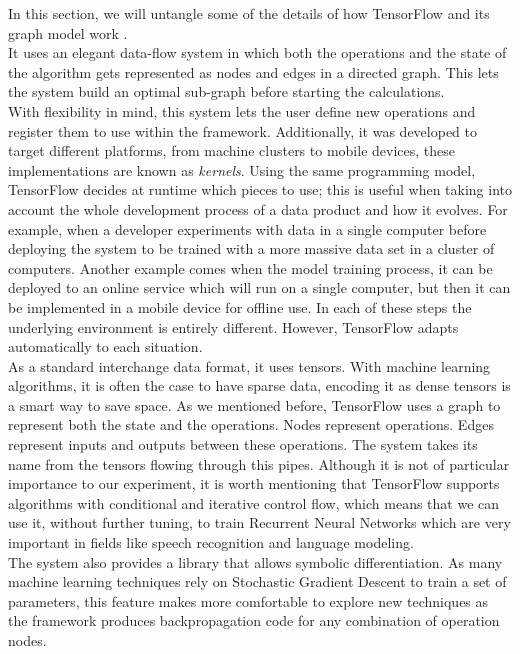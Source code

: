 In this section, we will untangle some of the details of how TensorFlow and its graph model work \cite{DBLP:journals/corr/AbadiBCCDDDGIIK16}.\\

It uses an elegant data-flow system in which both the operations and the state of the algorithm gets represented as nodes and edges in a directed graph. This lets the system build an optimal sub-graph before starting the calculations.\\

With flexibility in mind, this system lets the user define new operations and register them to use within the framework. Additionally, it was developed to target different platforms, from machine clusters to mobile devices, these implementations are known as \textit{kernels}. Using the same programming model, TensorFlow decides at runtime which pieces to use; this is useful when taking into account the whole development process of a data product and how it evolves. For example, when a developer experiments with data in a single computer before deploying the system to be trained with a more massive data set in a cluster of computers. Another example comes when the model training process, it can be deployed to an online service which will run on a single computer, but then it can be implemented in a mobile device for offline use. In each of these steps the underlying environment is entirely different. However, TensorFlow adapts automatically to each situation.\\


As a standard interchange data format, it uses tensors. With machine learning algorithms, it is often the case to have sparse data, encoding it as dense tensors is a smart way to save space. As we mentioned before, TensorFlow uses a graph to represent both the state and the operations. Nodes represent operations. Edges represent inputs and outputs between these operations. The system takes its name from the tensors flowing through this pipes. Although it is not of particular importance to our experiment, it is worth mentioning that TensorFlow supports algorithms with conditional and iterative control flow, which means that we can use it, without further tuning, to train Recurrent Neural Networks which are very important in fields like speech recognition and language modeling.\\

The system also provides a library that allows symbolic differentiation. As many machine learning techniques rely on Stochastic Gradient Descent to train a set of parameters, this feature makes more comfortable to explore new techniques as the framework produces backpropagation code for any combination of operation nodes.\\

